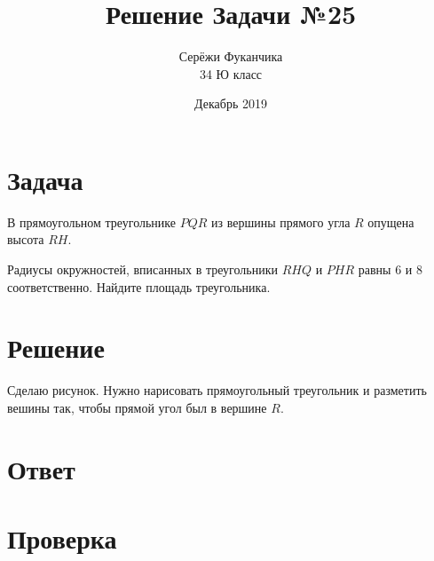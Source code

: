\documentclass{article}
\title{Решение Задачи №25}
\author{Серёжи Фуканчика\\34 Ю класс}
\date{Декабрь 2019}
\begin{document}
\maketitle

\section{Задача}
В прямоугольном треугольнике $PQR$ из вершины прямого угла $R$ опущена высота $RH$.

Радиусы окружностей, вписанных в треугольники $RHQ$ и $PHR$ равны $6$ и $8$ соответственно. Найдите площадь треугольника.

\section{Решение}
Сделаю рисунок. Нужно нарисовать прямоугольный треугольник и разметить вешины так, чтобы прямой угол был в вершине $R$.

\begin{center}\end{center}

\section{Ответ}

\section{Проверка}
\end{document}
